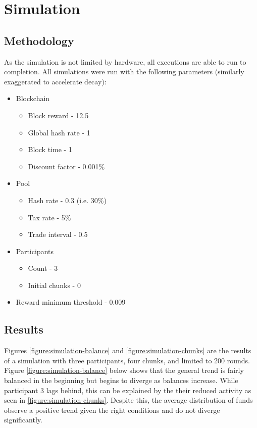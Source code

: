 \section{Simulation}

\subsection{Methodology}

As the simulation is not limited by hardware, all executions are able to run to completion. All simulations were run with the following parameters (similarly exaggerated to accelerate decay):

\begin{itemize}
    \item Blockchain
    \begin{itemize}
        \item Block reward - 12.5
        \item Global hash rate - 1
        \item Block time - 1
        \item Discount factor - 0.001\%
    \end{itemize}
    \item Pool 
    \begin{itemize}
        \item Hash rate - 0.3 (i.e. 30\%)
        \item Tax rate - 5\%
        \item Trade interval - 0.5
    \end{itemize}
    \item Participants
    \begin{itemize}
        \item Count - 3
        \item Initial chunks - 0
    \end{itemize}
    \item Reward minimum threshold - 0.009
\end{itemize}

\subsection{Results}

Figures \ref{figure:simulation-balance} and \ref{figure:simulation-chunks} are the results of a simulation with three participants, four chunks, and limited to 200 rounds. Figure \ref{figure:simulation-balance} below shows that the general trend is fairly balanced in the beginning but begins to diverge as balances increase. While participant 3 lags behind, this can be explained by the their reduced activity as seen in \cref{figure:simulation-chunks}. Despite this, the average distribution of funds observe a positive trend given the right conditions and do not diverge significantly.


